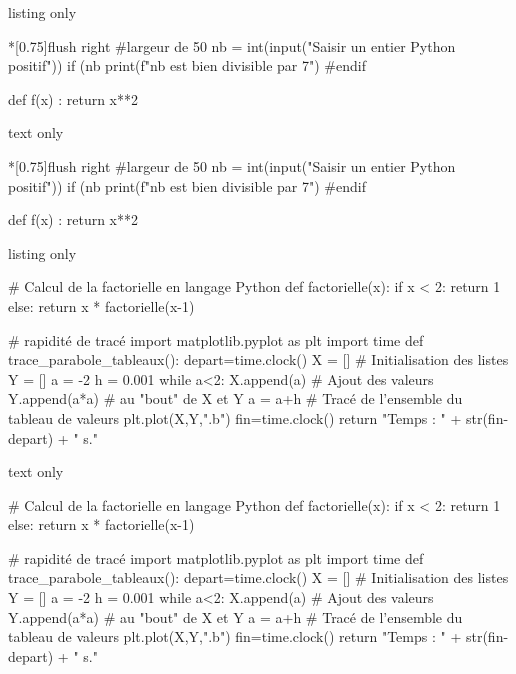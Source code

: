 \documentclass[a4paper,french,11pt]{article}
\begin{document}
\begin{PresCodeTexPL}{listing only}
\begin{CodePythonLstAlt}*[0.75\linewidth]{flush right}
#largeur de 50%
nb = int(input("Saisir un entier Python positif"))
if (nb %
	print(f"{nb} est bien divisible par 7")
#endif

def f(x) :
	return x**2
\end{CodePythonLstAlt}
\end{PresCodeTexPL}

\begin{PresCodeSortiePL}{text only}
\begin{CodePythonLstAlt}*[0.75\linewidth]{flush right}
#largeur de 50%
nb = int(input("Saisir un entier Python positif"))
if (nb %
	print(f"{nb} est bien divisible par 7")
#endif

def f(x) :
	return x**2
\end{CodePythonLstAlt}
\end{PresCodeSortiePL}

\begin{PresCodeTexPL}{listing only}
\begin{scontents}[overwrite,write-out=testscript.py]
# Calcul de la factorielle en langage Python
def factorielle(x):
	if x < 2:
		return 1
	else:
		return x * factorielle(x-1)

# rapidité de tracé
import matplotlib.pyplot as plt
import time
def trace_parabole_tableaux():
	depart=time.clock()
	X = [] # Initialisation des listes
	Y = []
	a = -2
	h = 0.001
	while a<2:
		X.append(a) # Ajout des valeurs
		Y.append(a*a) # au "bout" de X et Y
		a = a+h
	# Tracé de l'ensemble du tableau de valeurs
	plt.plot(X,Y,".b")
	fin=time.clock()
	return "Temps : " + str(fin-depart) + " s."
\end{scontents}

\end{PresCodeTexPL}

\begin{PresCodeSortiePL}{text only}
\begin{scontents}[overwrite,write-out=testscript.py]
# Calcul de la factorielle en langage Python
def factorielle(x):
	if x < 2:
		return 1
	else:
		return x * factorielle(x-1)

# rapidité de tracé
import matplotlib.pyplot as plt
import time
def trace_parabole_tableaux():
	depart=time.clock()
	X = [] # Initialisation des listes
	Y = []
	a = -2
	h = 0.001
	while a<2:
		X.append(a) # Ajout des valeurs
		Y.append(a*a) # au "bout" de X et Y
		a = a+h
	# Tracé de l'ensemble du tableau de valeurs
	plt.plot(X,Y,".b")
	fin=time.clock()
	return "Temps : " + str(fin-depart) + " s."
\end{scontents}

\end{PresCodeSortiePL}
\end{document}
